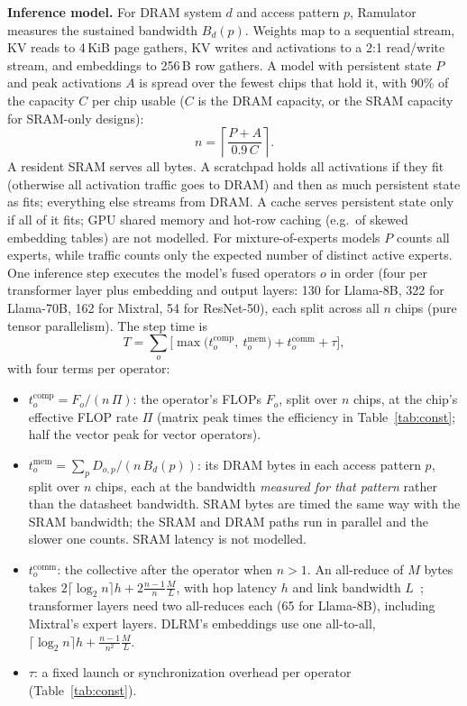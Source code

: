 \documentclass[conference]{IEEEtran}
\begin{document}
\textbf{Inference model.} For DRAM system $d$ and access pattern $p$, Ramulator measures the sustained bandwidth $B_d(p)$. Weights map to a sequential stream, KV reads to 4\,KiB page gathers, KV writes and activations to a 2:1 read/write stream, and embeddings to 256\,B row gathers. A model with persistent state $P$ and peak activations $A$ is spread over the fewest chips that hold it, with 90\% of the capacity $C$ per chip usable ($C$ is the DRAM capacity, or the SRAM capacity for SRAM-only designs):
\begin{equation}
n = \left\lceil \frac{P + A}{0.9\, C} \right\rceil .\label{eq:chips}
\end{equation}
A resident SRAM serves all bytes. A scratchpad holds all activations if they fit (otherwise all activation traffic goes to DRAM) and then as much persistent state as fits; everything else streams from DRAM. A cache serves persistent state only if all of it fits; GPU shared memory and hot-row caching (e.g.\ of skewed embedding tables) are not modelled. For mixture-of-experts models $P$ counts all experts, while traffic counts only the expected number of distinct active experts. One inference step executes the model's fused operators $o$ in order (four per transformer layer plus embedding and output layers: 130 for Llama-8B, 322 for Llama-70B, 162 for Mixtral, 54 for ResNet-50), each split across all $n$ chips (pure tensor parallelism). The step time is
\begin{equation}
T = \sum_{o} \Big[\max\big(t^{\mathrm{comp}}_o,\ t^{\mathrm{mem}}_o\big) + t^{\mathrm{comm}}_o + \tau\Big],\label{eq:step}
\end{equation}
with four terms per operator:
\begin{itemize}
\item $t^{\mathrm{comp}}_o = F_o/(n\,\Pi)$: the operator's FLOPs $F_o$, split over $n$ chips, at the chip's effective FLOP rate $\Pi$ (matrix peak times the efficiency in Table~\ref{tab:const}; half the vector peak for vector operators).
\item $t^{\mathrm{mem}}_o = \sum_p D_{o,p}/(n\,B_d(p))$: its DRAM bytes in each access pattern $p$, split over $n$ chips, each at the bandwidth \emph{measured for that pattern} rather than the datasheet bandwidth. SRAM bytes are timed the same way with the SRAM bandwidth; the SRAM and DRAM paths run in parallel and the slower one counts. SRAM latency is not modelled.
\item $t^{\mathrm{comm}}_o$: the collective after the operator when $n>1$. An all-reduce of $M$ bytes takes $2\lceil\log_2 n\rceil h + 2\frac{n-1}{n}\frac{M}{L}$, with hop latency $h$ and link bandwidth $L$~\cite{thakur2005}; transformer layers need two all-reduces each (65 for Llama-8B), including Mixtral's expert layers. DLRM's embeddings use one all-to-all, $\lceil\log_2 n\rceil h + \frac{n-1}{n^2}\frac{M}{L}$.
\item $\tau$: a fixed launch or synchronization overhead per operator (Table~\ref{tab:const}).
\end{itemize}
\end{document}
